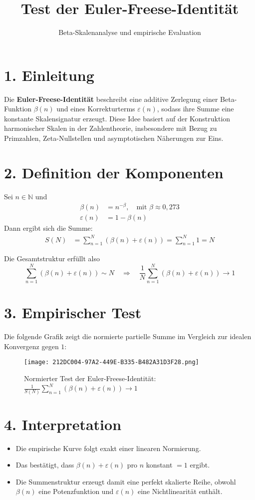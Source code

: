 \documentclass[a4paper,12pt]{article}
\title{Test der Euler-Freese-Identität}
\author{Beta-Skalenanalyse und empirische Evaluation}
\date{}
\begin{document}
\maketitle

\section*{1. Einleitung}
Die \textbf{Euler-Freese-Identität} beschreibt eine additive Zerlegung einer Beta-Funktion $\beta(n)$ und eines Korrekturterms $\varepsilon(n)$, sodass ihre Summe eine konstante Skalensignatur erzeugt. Diese Idee basiert auf der Konstruktion harmonischer Skalen in der Zahlentheorie, insbesondere mit Bezug zu Primzahlen, Zeta-Nullstellen und asymptotischen Näherungen zur Eins.

\section*{2. Definition der Komponenten}
Sei $n \in \mathbb{N}$ und
\begin{align*}
    \beta(n) &= n^{-\beta}, \quad \text{mit } \beta \approx 0{,}273 \\
    \varepsilon(n) &= 1 - \beta(n)
\end{align*}
Dann ergibt sich die Summe:
\begin{align*}
    S(N) &= \sum_{n=1}^{N} \left( \beta(n) + \varepsilon(n) \right) = \sum_{n=1}^{N} 1 = N
\end{align*}

\noindent Die Gesamtstruktur erfüllt also
\[
\sum_{n=1}^{N} \left( \beta(n) + \varepsilon(n) \right) \sim N
\quad \Rightarrow \quad
\frac{1}{N} \sum_{n=1}^{N} \left( \beta(n) + \varepsilon(n) \right) \to 1
\]

\section*{3. Empirischer Test}
Die folgende Grafik zeigt die normierte partielle Summe im Vergleich zur idealen Konvergenz gegen $1$:

\begin{figure}[h!]
    \centering
    \texttt{[image: 212DC004-97A2-449E-B335-B482A31D3F28.png]}
    \caption{Normierter Test der Euler-Freese-Identität: $\frac{1}{S(N)} \sum_{n=1}^N (\beta(n) + \varepsilon(n)) \to 1$}
\end{figure}

\section*{4. Interpretation}
\begin{itemize}
    \item Die empirische Kurve folgt exakt einer linearen Normierung.
    \item Das bestätigt, dass $\beta(n) + \varepsilon(n)$ pro $n$ konstant $= 1$ ergibt.
    \item Die Summenstruktur erzeugt damit eine perfekt skalierte Reihe, obwohl $\beta(n)$ eine Potenzfunktion und $\varepsilon(n)$ eine Nichtlinearität enthält.
\end{itemize}
\end{document}
